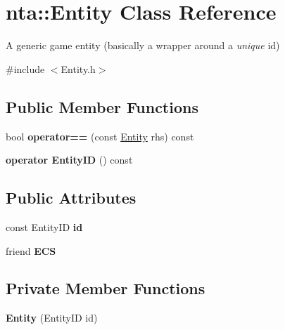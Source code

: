 \hypertarget{classnta_1_1Entity}{}\section{nta\+:\+:Entity Class Reference}
\label{classnta_1_1Entity}


A generic game entity (basically a wrapper around a {\itshape unique} id)  




{\ttfamily \#include $<$Entity.\+h$>$}

\subsection*{Public Member Functions}
\begin{DoxyCompactItemize}
\item 
\mbox{\label{classnta_1_1Entity_aff723c036ac1ece63d8055d818764c3c}} 
bool {\bfseries operator==} (const \hyperlink{classnta_1_1Entity}{Entity} rhs) const
\item 
\mbox{\label{classnta_1_1Entity_aec8296bdf8565e56d59a278eb08c5a8d}} 
{\bfseries operator Entity\+ID} () const
\end{DoxyCompactItemize}
\subsection*{Public Attributes}
\begin{DoxyCompactItemize}
\item 
\mbox{\label{classnta_1_1Entity_af797674b5554ea538096d4e02857050a}} 
const Entity\+ID {\bfseries id}
\item 
\mbox{\label{classnta_1_1Entity_a0b4015eb912924ecc59b61cc5800d1fc}} 
friend {\bfseries E\+CS}
\end{DoxyCompactItemize}
\subsection*{Private Member Functions}
\begin{DoxyCompactItemize}
\item 
\mbox{\label{classnta_1_1Entity_ab67de27303854161e6a4e57158dc1cec}} 
{\bfseries Entity} (Entity\+ID id)
\end{DoxyCompactItemize}


